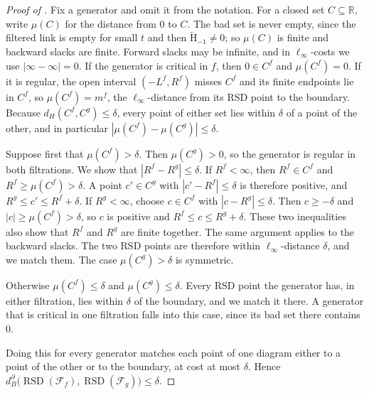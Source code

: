 \documentclass[11pt,letterpaper]{article}
\theoremstyle{definition}
\newcommand{\redH}{\widetilde{\mathrm H}}
\newcommand{\RSD}{\operatorname{RSD}}
\begin{document}
\begin{proof}[Proof of ]
Fix a generator and omit it from the notation. For a closed set
$C\subseteq\mathbb R$, write $\mu(C)$ for the distance from $0$ to $C$. The
bad set is never empty, since the filtered link is empty for small $t$ and
then $\redH_{-1}\neq0$; so $\mu(C)$ is finite and backward slacks are finite.
Forward slacks may be infinite, and in $\ell_\infty$-costs we use
$|\infty-\infty|=0$. If the generator is critical in $f$, then
$0\in C^f$ and $\mu(C^f)=0$. If it is regular, the open interval
$(-L^f,R^f)$ misses $C^f$ and its finite endpoints lie in $C^f$, so
$\mu(C^f)=m^f$, the $\ell_\infty$-distance from its RSD point to the boundary.
Because $d_H(C^f,C^g)\leq\delta$, every point of either set lies within
$\delta$ of a point of the other, and in particular
$|\mu(C^f)-\mu(C^g)|\leq\delta$.

Suppose first that $\mu(C^f)>\delta$. Then $\mu(C^g)>0$, so the generator is
regular in both filtrations. We show that $|R^f-R^g|\leq\delta$. If
$R^f<\infty$, then $R^f\in C^f$ and $R^f\geq\mu(C^f)>\delta$. A point
$c'\in C^g$ with $|c'-R^f|\leq\delta$ is therefore positive, and
$R^g\leq c'\leq R^f+\delta$. If $R^g<\infty$, choose $c\in C^f$ with
$|c-R^g|\leq\delta$. Then $c\geq-\delta$ and $|c|\geq\mu(C^f)>\delta$, so $c$
is positive and $R^f\leq c\leq R^g+\delta$. These two inequalities also show
that $R^f$ and $R^g$ are finite together. The same argument applies to the
backward slacks. The two RSD points are therefore within $\ell_\infty$-distance
$\delta$, and we match them. The case $\mu(C^g)>\delta$ is symmetric.

Otherwise $\mu(C^f)\leq\delta$ and $\mu(C^g)\leq\delta$. Every RSD point the
generator has, in either filtration, lies within $\delta$ of the boundary, and
we match it there. A generator that is critical in one filtration falls into
this case, since its bad set there contains $0$.

Doing this for every generator matches each point of one diagram either to a
point of the other or to the boundary, at cost at most $\delta$. Hence
$d_B^\partial\bigl(\RSD(\mathcal F_f),\RSD(\mathcal F_g)\bigr)\leq\delta$.
\end{proof}
\end{document}
